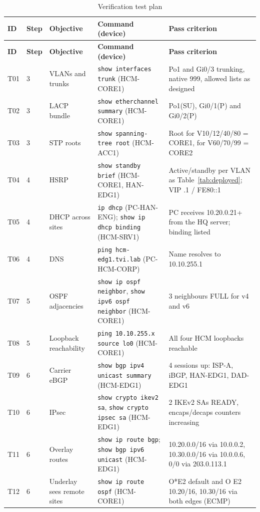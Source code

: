 \documentclass[11pt,a4paper]{article}
\begin{document}
{\small\setlength{\tabcolsep}{4pt}
\begin{longtable}{@{}p{0.8cm}p{0.7cm}p{3.3cm}p{4.6cm}p{5.4cm}@{}}
\caption{Verification test plan}\label{tab:tests}\\
\toprule
\textbf{ID} & \textbf{Step} & \textbf{Objective} & \textbf{Command (device)} & \textbf{Pass criterion}\\
\midrule\endfirsthead
\toprule
\textbf{ID} & \textbf{Step} & \textbf{Objective} & \textbf{Command (device)} & \textbf{Pass criterion}\\
\midrule\endhead
T01 & 3 & VLANs and trunks & \texttt{show interfaces trunk} (HCM-CORE1) & Po1 and Gi0/3 trunking, native 999, allowed lists as designed\\
T02 & 3 & LACP bundle & \texttt{show etherchannel summary} (HCM-CORE1) & Po1(SU), Gi0/1(P) and Gi0/2(P)\\
T03 & 3 & STP roots & \texttt{show spanning-tree root} (HCM-ACC1) & Root for V10/12/40/80 = CORE1, for V60/70/99 = CORE2\\
T04 & 4 & HSRP & \texttt{show standby brief} (HCM-CORE1, HAN-EDG1) & Active/standby per VLAN as Table~\ref{tab:deployed}; VIP .1 / FE80::1\\
T05 & 4 & DHCP across sites & \texttt{ip dhcp} (PC-HAN-ENG); \texttt{show ip dhcp binding} (HCM-SRV1) & PC receives 10.20.0.21+ from the HQ server; binding listed\\
T06 & 4 & DNS & \texttt{ping hcm-edg1.tvi.lab} (PC-HCM-CORP) & Name resolves to 10.10.255.1\\
T07 & 5 & OSPF adjacencies & \texttt{show ip ospf neighbor}, \texttt{show ipv6 ospf neighbor} (HCM-CORE1) & 3 neighbours FULL for v4 and v6\\
T08 & 5 & Loopback reachability & \texttt{ping 10.10.255.x source lo0} (HCM-CORE1) & All four HCM loopbacks reachable\\
T09 & 6 & Carrier eBGP & \texttt{show bgp ipv4 unicast summary} (HCM-EDG1) & 4 sessions up: ISP-A, iBGP, HAN-EDG1, DAD-EDG1\\
T10 & 6 & IPsec & \texttt{show crypto ikev2 sa}, \texttt{show crypto ipsec sa} (HCM-EDG1) & 2 IKEv2 SAs READY, encaps/decaps counters increasing\\
T11 & 6 & Overlay routes & \texttt{show ip route bgp}; \texttt{show bgp ipv6 unicast} (HCM-EDG1) & 10.20.0.0/16 via 10.0.0.2, 10.30.0.0/16 via 10.0.0.6, 0/0 via 203.0.113.1\\
T12 & 6 & Underlay sees remote sites & \texttt{show ip route ospf} (HCM-CORE1) & O*E2 default and O E2 10.20/16, 10.30/16 via both edges (ECMP)\\

\end{longtable}}
\end{document}
